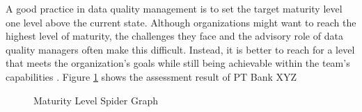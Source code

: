 \documentclass[conference]{IEEEtran}
\begin{document}
A good practice in data quality management is to set the target maturity level one level above the current state. Although organizations might want to reach the highest level of maturity, the challenges they face and the advisory role of data quality managers often make this difficult. Instead, it is better to reach for a level that meets the organization's goals while still being achievable within the team’s capabilities \cite{loshin_dqi}. Figure \ref{fig:maturity-level-spider-graph} shows the assessment result of PT Bank XYZ

\begin{figure}[h]
    \centering
    \caption{Maturity Level Spider Graph}
    \label{fig:maturity-level-spider-graph}
\end{figure}
\end{document}
